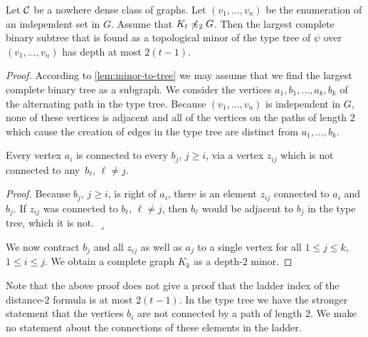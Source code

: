 \begin{theorem}
Let $\mathcal{C}$ be a nowhere dense class of graphs. Let 
$(v_1,\ldots, v_n)$ be the enumeration of an independent set 
in $G$. Assume that $K_t\not\preccurlyeq_2G$. 
Then the largest complete binary subtree that is found as a topological minor 
of the type tree of $\psi$ over
$(v_1,\ldots, v_n)$ has depth at most $2(t-1)$. 
\end{theorem}
\begin{proof}
According to \cref{lem:minor-to-tree} we may assume that we find
the largest complete binary tree as a subgraph. We consider the
vertices $a_1,b_1,\ldots, a_k,b_k$ of the alternating path in the
type tree. Because $(v_1,\ldots, v_n)$ is independent in $G$, 
none of these vertices is adjacent and all of the vertices on the
paths of length $2$ which cause the creation of edges in the type
tree are distinct from $a_1,\ldots, b_k$. 

\begin{claim}
Every vertex $a_i$ is connected to every $b_j$, $j\geq i$,
via a vertex $z_{ij}$ which is not connected to any~$b_\ell$, $\ell\neq j$. 
\end{claim}

\noindent\textit{Proof.} Because $b_j$, $j\geq i$, is right of $a_i$, there is 
an element $z_{ij}$ connected to $a_i$ and $b_j$. If $z_{ij}$ was 
connected to $b_\ell$, $\ell\neq j$, then $b_\ell$ would be adjacent 
to $b_j$ in the type tree, which it is not. \hfill$\lrcorner$

\bigskip
We now contract $b_j$ and all $z_{ij}$ as well as $a_j$ to a single 
vertex for all $1\leq j\leq k$, $1\leq i\leq j$. We obtain a complete
graph $K_k$ as a depth-$2$ minor. 
\end{proof}

Note that the above proof does not give a proof that the ladder
index of the distance-$2$ formula is at most $2(t-1)$. In the type
tree we have the stronger statement that the vertices $b_i$
are not connected by a path of length $2$. 
We make no statement about the connections
of these elements in the ladder. 

